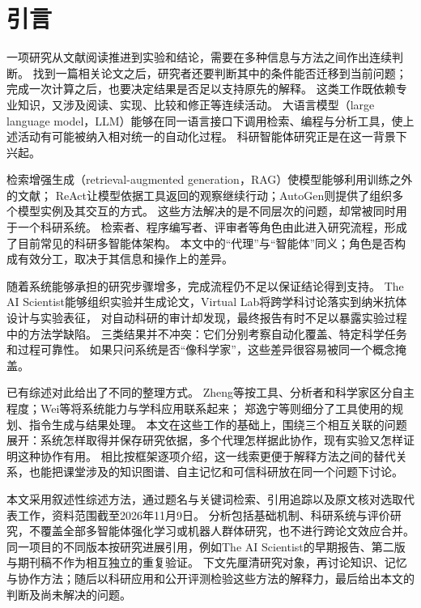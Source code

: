 \section{引言}
一项研究从文献阅读推进到实验和结论，需要在多种信息与方法之间作出连续判断。
找到一篇相关论文之后，研究者还要判断其中的条件能否迁移到当前问题；完成一次计算之后，也要决定结果是否足以支持原先的解释。
这类工作既依赖专业知识，又涉及阅读、实现、比较和修正等连续活动。
大语言模型（large language model，LLM）能够在同一语言接口下调用检索、编程与分析工具，使上述活动有可能被纳入相对统一的自动化过程。
科研智能体研究正是在这一背景下兴起\cite{surveyautonomy,surveyagentic}。

检索增强生成（retrieval-augmented generation，RAG）使模型能够利用训练之外的文献\cite{rag}；
ReAct让模型依据工具返回的观察继续行动\cite{react}；AutoGen则提供了组织多个模型实例及其交互的方式\cite{autogen}。
这些方法解决的是不同层次的问题，却常被同时用于一个科研系统。
检索者、程序编写者、评审者等角色由此进入研究流程，形成了目前常见的科研多智能体架构。
本文中的“代理”与“智能体”同义；角色是否构成有效分工，取决于其信息和操作上的差异。

随着系统能够承担的研究步骤增多，完成流程仍不足以保证结论得到支持。
The AI Scientist能够组织实验并生成论文\cite{scientistjournal}，Virtual Lab将跨学科讨论落实到纳米抗体设计与实验表征\cite{virtual}，
对自动科研的审计却发现，最终报告有时不足以暴露实验过程中的方法学缺陷\cite{pitfalls}。
三类结果并不冲突：它们分别考察自动化覆盖、特定科学任务和过程可靠性。
如果只问系统是否“像科学家”，这些差异很容易被同一个概念掩盖。

已有综述对此给出了不同的整理方式。
Zheng等按工具、分析者和科学家区分自主程度\cite{surveyautonomy}；Wei等将系统能力与学科应用联系起来\cite{surveyagentic}；
郑逸宁等则细分了工具使用的规划、指令生成与结果处理\cite{surveytool}。
本文在这些工作的基础上，围绕三个相互关联的问题展开：系统怎样取得并保存研究依据，多个代理怎样据此协作，现有实验又怎样证明这种协作有用。
相比按框架逐项介绍，这一线索更便于解释方法之间的替代关系，也能把课堂涉及的知识图谱、自主记忆和可信科研放在同一个问题下讨论。

本文采用叙述性综述方法，通过题名与关键词检索、引用追踪以及原文核对选取代表工作，资料范围截至2026年11月9日。
分析包括基础机制、科研系统与评价研究，不覆盖全部多智能体强化学习或机器人群体研究，也不进行跨论文效应合并。
同一项目的不同版本按研究进展引用，例如The AI Scientist的早期报告、第二版与期刊稿不作为相互独立的重复验证。
下文先厘清研究对象，再讨论知识、记忆与协作方法；随后以科研应用和公开评测检验这些方法的解释力，最后给出本文的判断及尚未解决的问题。
